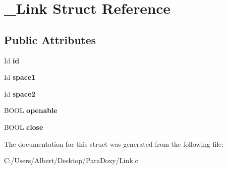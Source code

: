 \hypertarget{struct___link}{\section{\-\_\-\-Link Struct Reference}
\label{struct___link}
}
\subsection*{Public Attributes}
\begin{DoxyCompactItemize}
\item 
\hypertarget{struct___link_a151212e7a8e8274c2a1ee991ba95878b}{Id {\bfseries id}}\label{struct___link_a151212e7a8e8274c2a1ee991ba95878b}

\item 
\hypertarget{struct___link_aabaabaea67e2e626e413fab3324087ff}{Id {\bfseries space1}}\label{struct___link_aabaabaea67e2e626e413fab3324087ff}

\item 
\hypertarget{struct___link_aa526fe717007b3865bf2bd7b9dd0655d}{Id {\bfseries space2}}\label{struct___link_aa526fe717007b3865bf2bd7b9dd0655d}

\item 
\hypertarget{struct___link_a0acb167798b0e967caa5deb81ff5970b}{B\-O\-O\-L {\bfseries openable}}\label{struct___link_a0acb167798b0e967caa5deb81ff5970b}

\item 
\hypertarget{struct___link_ac38ff420d1ca240f0da9e75f8c3a9e1d}{B\-O\-O\-L {\bfseries close}}\label{struct___link_ac38ff420d1ca240f0da9e75f8c3a9e1d}

\end{DoxyCompactItemize}


The documentation for this struct was generated from the following file\-:\begin{DoxyCompactItemize}
\item 
C\-:/\-Users/\-Albert/\-Desktop/\-Para\-Doxy/Link.\-c\end{DoxyCompactItemize}
